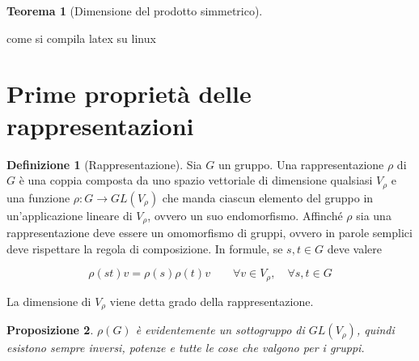 \documentclass[11pt]{article}
\theoremstyle{plain}
\newtheorem{thm}{Teorema}[section]
\newtheorem{prop}[thm]{Proposizione}
\theoremstyle{definition}
\newtheorem{defn}{Definizione}[section]
\theoremstyle{remark}
\begin{document}
\begin{thm}[Dimensione del prodotto simmetrico]



\label{thm:prodotto simmetrico}
\end{thm}



come si compila latex su linux




















\newpage
\section{Prime proprietà delle rappresentazioni}

\begin{defn}[Rappresentazione] Sia $G$ un gruppo. Una rappresentazione $\rho$ di $G$ è una coppia composta da uno spazio vettoriale di dimensione qualsiasi $V_\rho$ e una funzione $\rho: G \to GL(V_\rho)$ che manda ciascun elemento del gruppo in un'applicazione lineare di $V_\rho$, ovvero un suo endomorfismo. Affinché $\rho$ sia una rappresentazione deve essere un omomorfismo di gruppi, ovvero in parole semplici deve rispettare la regola di composizione. In formule, se $s, t \in G$ deve valere

\[ \rho(st) v = \rho(s)\rho(t) v \qquad \forall v \in V_\rho, \quad \forall s,t \in G\]

La dimensione di $V_\rho$ viene detta grado della rappresentazione.

\end{defn}

\begin{prop} $\rho(G)$ è evidentemente un sottogruppo di $GL(V_\rho)$, quindi esistono sempre inversi, potenze e tutte le cose che valgono per i gruppi.

\end{prop}
\end{document}

